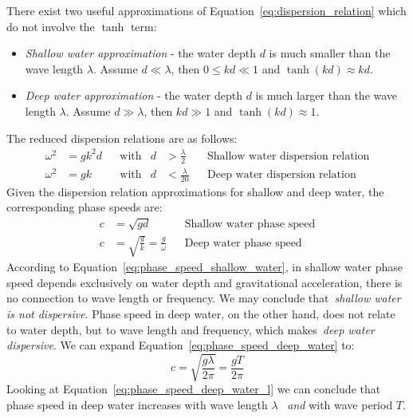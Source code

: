 There exist two useful approximations of Equation~\ref{eq:dispersion_relation} which do not involve the $\tanh$ term:
\begin{itemize}
 \item \emph{Shallow water approximation} - the water depth $d$ is much smaller than the wave length $\lambda$.
 Assume $d \ll \lambda$, then $0 \leq kd \ll 1$ and $\tanh(kd) \approx kd$.
 \item \emph{Deep water approximation} - the water depth $d$ is much larger than the wave length $\lambda$.
 Assume $d \gg \lambda$, then $kd \gg 1$ and $\tanh(kd) \approx 1$.
\end{itemize}
%
The reduced dispersion relations are as follows:
\begin{align}
 \omega^2 & = gk^2d && \text{with} & d &> \frac{\lambda}{2}  && \text{Shallow water dispersion relation}\\
 \omega^2 & = gk    && \text{with} & d &< \frac{\lambda}{20} && \text{Deep water dispersion relation}
\end{align}
%
Given the dispersion relation approximations for shallow and deep water, the corresponding
phase speeds are:
\begin{align}
 \label{eq:phase_speed_shallow_water} c &= \sqrt{gd} && \text{Shallow water phase speed}\\
  \label{eq:phase_speed_deep_water}   c &= \sqrt{\frac{g}{k}} = \frac{g}{\omega} && \text{Deep water phase speed}
\end{align}
%
According to Equation~\ref{eq:phase_speed_shallow_water}, in shallow water phase speed depends exclusively
on water depth and gravitational acceleration, there is no connection to wave length or frequency.
We may conclude that~\emph{shallow water is not dispersive}. Phase speed in deep water, on the other hand,
does not relate to water depth, but to wave length and frequency, which makes~\emph{deep water dispersive}.
We can expand Equation~\ref{eq:phase_speed_deep_water} to:
%
\begin{equation}
\label{eq:phase_speed_deep_water_l}
 c = \sqrt{\frac{g\lambda}{2\pi}} = \frac{gT}{2\pi}
\end{equation}
%
Looking at Equation~\ref{eq:phase_speed_deep_water_l} we can conclude that phase speed in deep water increases
with wave length $\lambda$ ~\emph{and} with wave period $T$.
%
